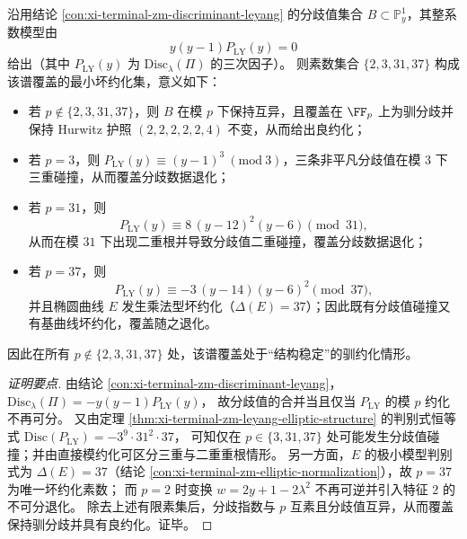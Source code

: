 \begin{conclusion}[覆盖的最小坏约化素集与分歧值碰撞的精确控制]\label{con:xi-terminal-zm-cover-minimal-bad-reduction-set}
沿用结论 \ref{con:xi-terminal-zm-discriminant-leyang} 的分歧值集合 \(B\subset\mathbb P^1_y\)，其整系数模型由
\[
y(y-1)P_{\mathrm{LY}}(y)=0
\]
给出（其中 \(P_{\mathrm{LY}}(y)\) 为 \(\mathrm{Disc}_\lambda(\Pi)\) 的三次因子）。
则素数集合 \(\{2,3,31,37\}\) 构成该谱覆盖的最小坏约化集，意义如下：
\begin{itemize}
  \item 若 \(p\notin\{2,3,31,37\}\)，则 \(B\) 在模 \(p\) 下保持互异，且覆盖在 \(\FF_p\) 上为驯分歧并保持 Hurwitz 护照 \((2,2,2,2,2,4)\) 不变，从而给出良约化；
  \item 若 \(p=3\)，则 \(P_{\mathrm{LY}}(y)\equiv (y-1)^3\ (\mathrm{mod}\ 3)\)，三条非平凡分歧值在模 \(3\) 下三重碰撞，从而覆盖分歧数据退化；
  \item 若 \(p=31\)，则
  \[
  P_{\mathrm{LY}}(y)\equiv 8\,(y-12)^{2}(y-6)\pmod{31},
  \]
  从而在模 \(31\) 下出现二重根并导致分歧值二重碰撞，覆盖分歧数据退化；
  \item 若 \(p=37\)，则
  \[
  P_{\mathrm{LY}}(y)\equiv -3\,(y-14)(y-6)^{2}\pmod{37},
  \]
  并且椭圆曲线 \(E\) 发生乘法型坏约化（\(\Delta(E)=37\)）；因此既有分歧值碰撞又有基曲线坏约化，覆盖随之退化。
\end{itemize}
因此在所有 \(p\notin\{2,3,31,37\}\) 处，该谱覆盖处于“结构稳定”的驯约化情形。
\end{conclusion}
\begin{proof}[证明要点]
由结论 \ref{con:xi-terminal-zm-discriminant-leyang}，
\(
\mathrm{Disc}_\lambda(\Pi)=-y(y-1)P_{\mathrm{LY}}(y)
\)，
故分歧值的合并当且仅当 \(P_{\mathrm{LY}}\) 的模 \(p\) 约化不再可分。
又由定理 \ref{thm:xi-terminal-zm-leyang-elliptic-structure} 的判别式恒等式
\(
\mathrm{Disc}(P_{\mathrm{LY}})=-3^{9}\cdot 31^{2}\cdot 37
\)，
可知仅在 \(p\in\{3,31,37\}\) 处可能发生分歧值碰撞；并由直接模约化可区分三重与二重重根情形。
另一方面，\(E\) 的极小模型判别式为 \(\Delta(E)=37\)（结论 \ref{con:xi-terminal-zm-elliptic-normalization}），故 \(p=37\) 为唯一坏约化素数；
而 \(p=2\) 时变换 \(w=2y+1-2\lambda^2\) 不再可逆并引入特征 \(2\) 的不可分退化。
除去上述有限素集后，分歧指数与 \(p\) 互素且分歧值互异，从而覆盖保持驯分歧并具有良约化。证毕。
\end{proof}

